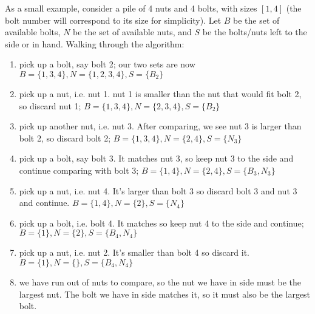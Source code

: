 \documentclass[12pt]{article}
\begin{document}
\begin{enumerate}
    As a small example, consider a pile of 4 nuts and 4 bolts, with sizes $[1, 4]$ (the bolt number will correspond to its 
    size for simplicity). Let $B$ be the set of available bolts, $N$ be the set of available nuts, and $S$ be the bolts/nuts 
    left to the side or in hand. Walking through the algorithm:

    \begin{enumerate}
        \item pick up a bolt, say bolt 2; our two sets are now $B = \{1, 3, 4\}, N = \{1, 2, 3, 4\}, S = \{B_2\}$
        \item pick up a nut, i.e. nut 1. nut 1 is smaller than the nut that would fit bolt 2, so discard nut 1; $B = \{1, 3, 4\}, N = \{2, 3, 4\}, S = \{B_2\}$
        \item pick up another nut, i.e. nut 3. After comparing, we see nut 3 is larger than bolt 2, so discard bolt 2; $B = \{1, 3, 4\}, N = \{2, 4\}, S = \{N_3\}$
        \item pick up a bolt, say bolt 3. It matches nut 3, so keep nut 3 to the side and continue comparing with bolt 3; $B = \{1, 4\}, N = \{2, 4\}, S = \{B_3, N_3\}$
        \item pick up a nut, i.e. nut 4. It's larger than bolt 3 so discard bolt 3 and nut 3 and continue. $B = \{1, 4\}, N = \{2\}, S = \{N_4\}$
        \item pick up a bolt, i.e. bolt 4. It matches so keep nut 4 to the side and continue; $B = \{1\}, N = \{2\}, S = \{B_4, N_4\}$
        \item pick up a nut, i.e. nut 2. It's smaller than bolt 4 so discard it. $B = \{1\}, N = \{\}, S = \{B_4, N_4\}$
        \item we have run out of nuts to compare, so the nut we have in side must be the largest nut. The bolt we have in side matches it, 
        so it must also be the largest bolt.
    \end{enumerate}
\end{enumerate}
\end{document}
